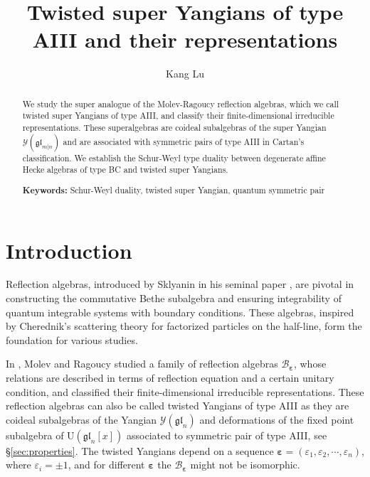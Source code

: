 \documentclass[11pt,reqno]{amsart}
\numberwithin{equation}{section}
\theoremstyle{definition}
\theoremstyle{remark}
\newcommand{\gl}{\mathfrak{gl}}
\newcommand{\ve}{\varepsilon}
\begin{document}
\pagestyle{myheadings}
\setcounter{page}{1}

\title[Twisted super Yangians of type AIII]{Twisted super Yangians of type AIII and their representations}

\author{Kang Lu}
\address{Department of Mathematics, University of Virginia, Charlottesville, VA 22903, USA}

\begin{abstract}
We study the super analogue of the Molev-Ragoucy reflection algebras, which we call twisted super Yangians of type AIII, and classify their finite-dimensional irreducible representations. These superalgebras are coideal subalgebras of the super Yangian $\mathscr{Y}(\gl_{m|n})$ and are associated with symmetric pairs of type AIII in Cartan's classification.
We establish the Schur-Weyl type duality between degenerate affine Hecke algebras of type BC and twisted super Yangians.

        \medskip

        \noindent
        {\bf Keywords:} Schur-Weyl duality, twisted super Yangian, quantum symmetric pair

\end{abstract}


\maketitle
\setcounter{tocdepth}{1}
\tableofcontents

\thispagestyle{empty}


\section{Introduction}
Reflection algebras, introduced by Sklyanin in his seminal paper \cite{Sklyanin1988Boundary}, are pivotal in constructing the commutative Bethe subalgebra and ensuring integrability of quantum integrable systems with boundary conditions. These algebras, inspired by Cherednik's scattering theory \cite{Cherednik1984Factorizing} for factorized particles on the half-line, form the foundation for various studies.

In \cite{Molev2002reflection}, Molev and Ragoucy studied a family of reflection algebras $\mathscr B_{\bm\ve}$, whose relations are described in terms of reflection equation and a certain unitary condition, and classified their finite-dimensional irreducible representations. These reflection algebras can also be called twisted Yangians of type AIII as they are coideal subalgebras of the Yangian $\mathscr Y(\gl_n)$ and deformations of the fixed point subalgebra of $\mathrm U(\gl_{n}[x])$ associated to symmetric pair of type AIII, see \S\ref{sec:properties}. The twisted Yangians depend on a sequence $\bm\ve=(\ve_1,\ve_2,\cdots,\ve_n)$, where $\ve_i=\pm 1$, and for different $\bm\ve$ the $\mathscr B_{\bm\ve}$ might not be isomorphic.
\end{document}
